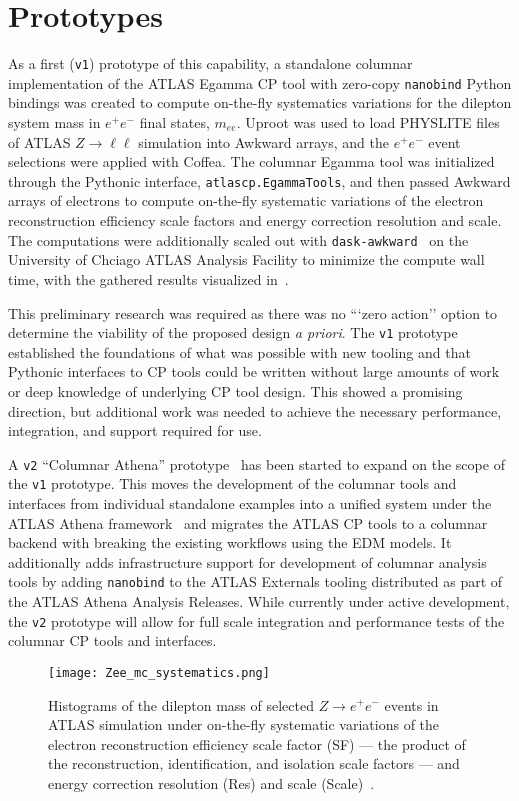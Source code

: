 \section{Prototypes}\label{sec:prototypes}

As a first (\texttt{v1}) prototype of this capability, a standalone columnar implementation of the ATLAS Egamma CP tool with zero-copy \texttt{nanobind} Python bindings was created to compute on-the-fly systematics variations for the dilepton system mass in $e^{+}e^{-}$ final states, $m_{ee}$.
Uproot was used to load PHYSLITE files of ATLAS $Z\to \ell\ell$ simulation into Awkward arrays, and the $e^{+}e^{-}$ event selections were applied with Coffea.
The columnar Egamma tool was initialized through the Pythonic interface, \texttt{atlascp.EgammaTools}, and then passed Awkward arrays of electrons to compute on-the-fly systematic variations of the electron reconstruction efficiency scale factors and energy correction resolution and scale.
The computations were additionally scaled out with \texttt{dask-awkward}~\cite{dask_awkward_2024} on the University of Chciago ATLAS Analysis Facility to minimize the compute wall time, with the gathered results visualized in~.

This preliminary research was required as there was no ```zero action'' option to determine the viability of the proposed design \textit{a priori}.
The \texttt{v1} prototype established the foundations of what was possible with new tooling and that Pythonic interfaces to CP tools could be written without large amounts of work or deep knowledge of underlying CP tool design.
This showed a promising direction, but additional work was needed to achieve the necessary performance, integration, and support required for use.

A \texttt{v2} ``Columnar Athena'' prototype~\cite{columnar_athena} has been started to expand on the scope of the \texttt{v1} prototype.
This moves the development of the columnar tools and interfaces from individual standalone examples into a unified system under the ATLAS Athena framework~\cite{ATLAS_Athena} and migrates the ATLAS CP tools to a columnar backend with breaking the existing workflows using the EDM models.
It additionally adds infrastructure support for development of columnar analysis tools by adding \texttt{nanobind} to the ATLAS Externals tooling distributed as part of the ATLAS Athena Analysis Releases.
While currently under active development, the \texttt{v2} prototype will allow for full scale integration and performance tests of the columnar CP tools and interfaces.

\begin{figure}
    \centering
    \texttt{[image: Zee\_mc\_systematics.png]}
    \caption{Histograms of the dilepton mass of selected $Z\to e^{+}e^{-}$ events in ATLAS simulation under on-the-fly systematic variations of the electron reconstruction efficiency scale factor (SF) --- the product of the reconstruction, identification, and isolation scale factors --- and energy correction resolution (Res) and scale (Scale)~\cite{Vigl:ACAT_2024}.}
    \label{fig:Zee_mc_systematics}
\end{figure}
